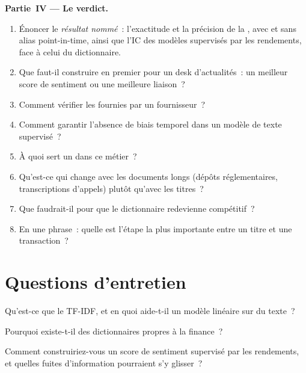 \begin{problem}
\medskip\noindent\textbf{Partie~IV --- Le verdict.}
\begin{enumerate}[resume]
\item Énoncer le \emph{résultat nommé}~: l'exactitude et la précision de la , avec et sans alias point-in-time,
ainsi que l'IC des modèles supervisés par les rendements, face à celui du dictionnaire.
\item Que faut-il construire en premier pour un desk d'actualités~: un meilleur score de sentiment ou une meilleure liaison~?
\item Comment vérifier les  fournies par un fournisseur~?
\item Comment garantir l'absence de biais temporel dans un modèle de texte supervisé~?
\item À quoi sert un  dans ce métier~?
\item Qu'est-ce qui change avec les documents longs (dépôts réglementaires, transcriptions d'appels) plutôt qu'avec les titres~?
\item Que faudrait-il pour que le dictionnaire redevienne compétitif~?
\item En une phrase~: quelle est l'étape la plus importante entre un titre et une transaction~?
\end{enumerate}
\end{problem}

\section{Questions d'entretien}

\begin{interviewq}\label{iq:ml:text-from-bag-of-words-to-embeddings:1}
Qu'est-ce que le TF-IDF, et en quoi aide-t-il un modèle linéaire sur du texte~?
\end{interviewq}

\begin{interviewq}\label{iq:ml:text-from-bag-of-words-to-embeddings:2}
Pourquoi existe-t-il des dictionnaires propres à la finance~?
\end{interviewq}

\begin{interviewq}\label{iq:ml:text-from-bag-of-words-to-embeddings:3}
Comment construiriez-vous un score de sentiment supervisé par les rendements, et quelles fuites d'information pourraient s'y glisser~?
\end{interviewq}

